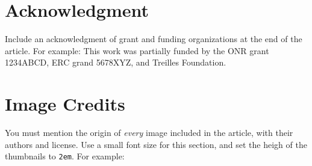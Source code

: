 \documentclass{ipol}
\begin{document}
\section*{Acknowledgment}

Include an acknowledgment of grant and funding organizations at the
end of the article. For example: This work was partially funded by the
ONR grant 1234ABCD, ERC grand 5678XYZ, and Treilles Foundation.

\section*{Image Credits}

You must mention the origin of \emph{every} image included in the article,
with their authors and license. Use a small font size for this
section, and set the heigh of the thumbnails to \verb|2em|. For example:\\




\end{document}
